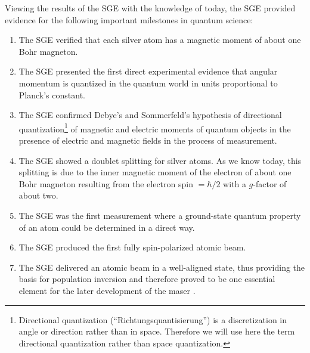 \documentclass{article}
\begin{document}
Viewing the results of the SGE with the knowledge of today, the SGE provided evidence for the following important milestones in quantum science:   
\begin{enumerate}                                                                                                                                                                                                                                
\item The SGE verified that each silver atom has a magnetic moment of about one Bohr magneton.
\item The SGE presented the first direct experimental evidence that angular momentum is quantized in the quantum world in units proportional to Planck's constant.                       
\item The SGE confirmed  Debye's and Sommerfeld's hypothesis of directional quantization\footnote{Directional quantization (``Richtungsquantisierung'') is a discretization in angle or direction rather than in space. Therefore we will use here the term directional quantization rather than space quantization.}  of magnetic and electric moments of quantum objects in the presence of electric and magnetic fields in the process of measurement.                                                                                                                                                                                                
\item The SGE showed a doublet splitting for silver atoms. As we know today, this splitting is due to the inner magnetic moment of the electron of about one Bohr magneton resulting from the electron spin $= \hbar/2$ with a $g$-factor of about two.                                                                                                                                                           
\item The SGE was the first measurement where a ground-state quantum property of an atom could be determined in a direct way.                                                                                                                                                                                       
\item The SGE produced the first fully spin-polarized atomic beam.                                                                                                    
\item The SGE delivered an atomic beam in a well-aligned state, thus providing the basis for population inversion and therefore proved to be one essential element for the later development of the maser \citep{GordonJEtal1955Maser}.                                                                                        

\end{enumerate}
\end{document}
